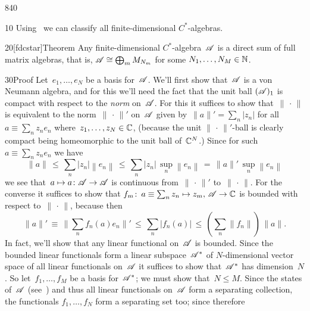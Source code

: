 \begin{parsec}{840}%
\begin{point}{10}%
Using~ we can classify
all finite-dimensional $C^*$-algebras.
\end{point}
\begin{point}{20}[fdcstar]{Theorem}%
%
%
Any finite-dimensional $C^*$-algebra~$\mathscr{A}$
is
a direct sum
of full matrix algebras,
that is,
$\mathscr{A}\cong \bigoplus_m M_{N_m}$
for some  $N_1,\dotsc,N_M\in\mathbb{N}$.
\begin{point}{30}{Proof}%
Let~$e_1,\dotsc,e_N$ be a basis for~$\mathscr{A}$.
We'll first show that~$\mathscr{A}$ is a von Neumann algebra,
and for this we'll 
need the fact that the unit ball $(\mathscr{A})_1$
is compact with respect to the \emph{norm} on~$\mathscr{A}$.
For this it suffices
to show that~$\|\,\cdot\,\|$
is equivalent to the norm~$\|\,\cdot\,\|'$ on~$\mathscr{A}$
given by~$\|a\|'=\sum_n\left|z_n\right|$
for all $a\equiv \sum_n z_n e_n$
where~$z_1,\dotsc,z_N\in\mathbb{C}$,
(because the unit $\|\,\cdot\,\|'$-ball is clearly compact
being homeomorphic to the unit ball of~$\mathbb{C}^N$.)
Since for such~$a\equiv \sum_n z_n e_n$
we have
\begin{equation*}
	\textstyle
\|a\|\,\leq\, \sum_n\left|z_n\right| \left\|e_n\right\|
\,\leq\,\sum_n\left|z_n\right| \,\sup_n\left\|e_n\right\|
	\,=\, \|a\|'\,\sup_n\left\|e_n\right\|
\end{equation*}
we see that~$a\mapsto a\colon \mathscr{A}\to\mathscr{A}$
is continuous from~$\|\,\cdot\,\|'$
to~$\|\,\cdot\,\|$.
For the converse
it suffices to show that
$f_m\colon\, a\equiv \sum_n z_n \mapsto z_m,\, 
\mathscr{A}\to\mathbb{C}$
is bounded with respect to~$\|\,\cdot\,\|$,
because then
\begin{equation*}
	\textstyle
	\|a\|'\,\equiv\, \|\sum_n f_n (a)e_n\|'
	\,\leq\, \sum_n\left|f_n(a)\right| 
	\,\leq\, (\sum_n \|f_n\|)\,\|a\|.
\end{equation*}
In fact,
we'll show that any linear functional on~$\mathscr{A}$
is bounded.
Since the bounded linear functionals
form a linear subspace~$\mathscr{A}^*$
of $N$-dimensional vector space of all linear functionals 
on~$\mathscr{A}$
it suffices to show that~$\mathscr{A}^*$ has dimension~$N$.
So let~$f_1,\dotsc,f_M$ be a basis for~$\mathscr{A}^*$;
we must show that~$N\leq M$.
Since the states of~$\mathscr{A}$
(see~)
and thus all linear functionals on~$\mathscr{A}$
form a separating collection,
the functionals $f_1,\dotsc,f_N$
form a separating set too;
since therefore
\begin{equation*}

\end{equation*}
\end{point}
\end{point}
\end{parsec}
